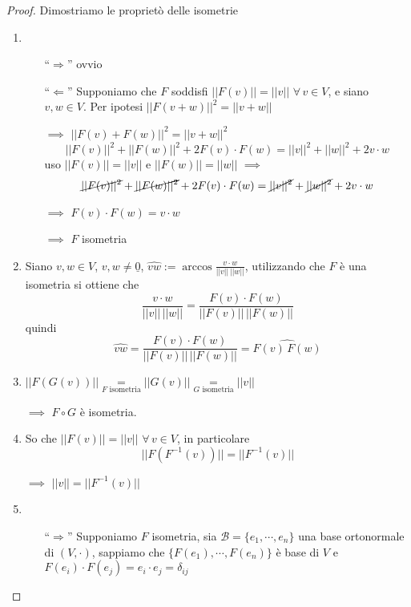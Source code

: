 \begin{proof}
    Dimostriamo le proprietò delle isometrie
    \begin{enumerate}
        \item \begin{itemize}
            \item [``$\Rightarrow$''] ovvio
            \item [``$\Leftarrow$''] Supponiamo che $ F $ soddisfi $ ||F(v)||=||v|| $ $ \forall\, v \in V $, e siano $ v,w \in V $. Per ipotesi $ ||F(v+w)||^{2}=||v+w|| $ 
            
            $\implies$ $ ||F(v)+F(w)||^{2}= ||v+w||^{2}$ \[
                ||F(v)||^{2}+||F(w)||^{2}+ 2 F(v) \cdot F(w)= ||v||^{2}+||w||^{2}+2v \cdot w
            \] uso $ ||F(v)||=||v|| $ e $ ||F(w)||=||w|| $ 
            $\implies$ \[
                \cancel{||F(v)||^{2}}+\cancel{||F(w)||^{2}}+ 2 F(v) \cdot F(w)= \cancel{||v||^{2}}+\cancel{||w||^{2}}+2v \cdot w
            \] 
            
            $\implies$ $ F(v) \cdot F(w) = v \cdot w $ 
            
            $\implies$ $ F $ isometria
        \end{itemize}
        \item Siano $ v,w \in V $, $ v,w \neq \underline{0} $, $ \hat{vw}:=\arccos \frac{v \cdot w}{||v||\,||w||} $, utilizzando che $ F $ è una isometria si ottiene che \[
            \frac{v \cdot w}{||v||\,||w||} = \frac{F(v) \cdot F(w)}{||F(v)||\,||F(w)||}
        \] quindi \[
            \hat{vw}=\frac{F(v) \cdot F(w)}{||F(v)||\,||F(w)||}=\widehat{F(v)\,F(w)}
        \]
        \item $ ||F(G(v))|| \underset{F\text{ isometria}}{=} ||G(v)|| \underset{G\text{ isometria}}{=} ||v||$ 
        
        $\implies$ $ F\circ G $ è isometria.
    \item So che $ ||F(v)||=||v|| $ $ \forall\, v \in V $, in particolare \[
        ||F(F^{-1}(v))||=||F^{-1}(v)||
    \] 
    
    $\implies$ $ ||v||=||F^{-1}(v)|| $

    \item \begin{itemize}
        \item [``$\Rightarrow$''] Supponiamo $ F $ isometria, sia $ \mathscr{B}=\{e_1, \cdots, e_{n} \} $ una base ortonormale di $ (V, \cdot ) $, sappiamo che $ \{F(e_1), \cdots, F(e_{n} )\} $ è base di $ V $ e $ F(e_i) \cdot F(e_{j} ) = e_{i} \cdot e_{j} =\delta_{ij}   $ 
        

\end{itemize}
\end{enumerate}
\end{proof}

